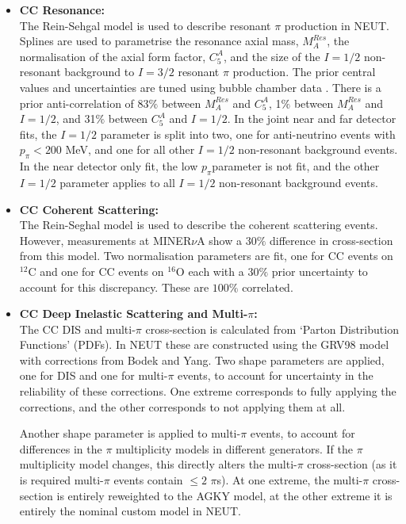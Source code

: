 \begin{itemize}
\item \textbf{CC Resonance:}\\
The Rein-Sehgal model\cite{reinessehgal} is used to describe resonant $\pi$ production in NEUT. Splines are used to parametrise the resonance axial mass, $M^{Res}_{A}$, the normalisation of the axial form factor, $C^{A}_{5}$, and the size of the $I=1/2$ non-resonant background to $I=3/2$ resonant $\pi$ production. The prior central values and uncertainties are tuned using bubble chamber data \cite{bubblechamber}. There is a prior anti-correlation of 83$\%$ between $M^{Res}_{A}$ and $C^{A}_{5}$, 1$\%$ between $M^{Res}_{A}$ and $I=1/2$, and 31$\%$ between $C^{A}_{5}$ and $I=1/2$. In the joint near and far detector fits, the $I=1/2$ parameter is split into two, one for anti-neutrino events with $p_{\pi} < 200$ MeV, and one for all other $I=1/2$ non-resonant background events. In the near detector only fit, the low $p_{\pi}$parameter is not fit, and the other $I=1/2$ parameter applies to all $I=1/2$ non-resonant background events.

\item \textbf{CC Coherent Scattering:}\\
The Rein-Seghal model \cite{reincoh} is used to describe the coherent scattering events.
However, measurements at MINER$\nu$A show a $30\%$ difference in cross-section from this model. Two normalisation parameters are fit, one for CC events on $^{12}$C and one for CC events on $^{16}$O each with a $30\%$ prior uncertainty to account for this discrepancy. These are $100\%$ correlated.

\item \textbf{CC Deep Inelastic Scattering and Multi-$\pi$:}\\
The CC DIS and multi-$\pi$ cross-section is calculated from `Parton Distribution Functions' (PDFs). In NEUT these are constructed using the GRV98\cite{grv98} model with corrections from Bodek and Yang\cite{by}. Two shape parameters are applied, one for DIS and one for multi-$\pi$ events, to account for uncertainty in the reliability of these corrections. One extreme corresponds to fully applying the corrections, and the other corresponds to not applying them at all.

Another shape parameter is applied to multi-$\pi$ events, to account for differences in the $\pi$ multiplicity models in different generators. If the $\pi$ multiplicity model changes, this directly alters the multi-$\pi$ cross-section (as it is required multi-$\pi$ events contain $\leq2$ $\pi$s). At one extreme, the multi-$\pi$ cross-section is entirely reweighted to the AGKY model\cite{agky}, at the other extreme it is entirely the nominal custom model in NEUT.


\end{itemize}
